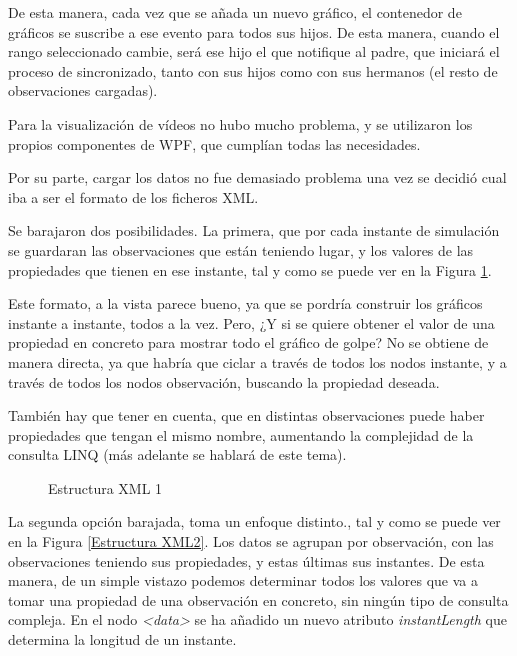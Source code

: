 De esta manera, cada vez que se a\~nada un nuevo gr\'afico, el contenedor de gr\'aficos se suscribe a ese evento para todos
sus hijos. De esta manera, cuando el rango seleccionado cambie, ser\'a ese hijo el que notifique al padre, que iniciar\'a
el proceso de sincronizado, tanto con sus hijos como con sus hermanos (el resto de observaciones cargadas).

Para la visualizaci\'on de v\'ideos no hubo mucho problema, y se utilizaron los
propios componentes de WPF, que cumpl\'ian todas las necesidades.

Por su parte, cargar los datos no fue demasiado problema una vez se decidi\'o cual iba a ser el formato de los
ficheros XML.

Se barajaron dos posibilidades. La primera, que por cada instante de simulaci\'on se guardaran las observaciones
que est\'an teniendo lugar, y los valores de las propiedades que tienen en ese instante, tal y como
se puede ver en la Figura \ref{Estructura XML1}.

Este formato, a la vista parece bueno, ya que se pordr\'ia construir los gr\'aficos instante a instante,
todos a la vez. Pero, ¿Y si se quiere obtener el valor de una propiedad en concreto para mostrar todo 
el gr\'afico de golpe? No se obtiene de manera directa, ya que habr\'ia que ciclar a trav\'es de todos los nodos
instante, y a trav\'es de todos los nodos observaci\'on, buscando la propiedad deseada.

Tambi\'en hay que tener en cuenta, que en distintas observaciones puede haber propiedades que tengan el mismo nombre, 
aumentando la complejidad de la consulta LINQ (m\'as adelante se hablar\'a de este tema).

\begin{figure}[h]
    
    \caption[Estructura XML 1]{Estructura XML 1}
    \label{Estructura XML1}
\end{figure}

La segunda opci\'on barajada, toma un enfoque distinto., tal y como se puede
ver en la Figura \ref{Estructura XML2}. Los datos se agrupan por observaci\'on, con las observaciones teniendo sus propiedades,
y estas \'ultimas sus instantes. De esta manera, de un simple vistazo podemos determinar todos los valores que va a tomar
una propiedad de una observaci\'on en concreto, sin ning\'un tipo de consulta compleja.
En el nodo \emph{<data>} se ha a\~{n}adido un nuevo atributo \emph{instantLength} que 
determina la longitud de un instante. 

